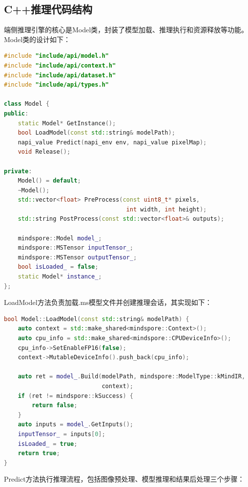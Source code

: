\subsection{C++推理代码结构}

端侧推理引擎的核心是Model类，封装了模型加载、推理执行和资源释放等功能。Model类的设计如下：

\begin{lstlisting}[language=C++, caption={Model类头文件}]
#include "include/api/model.h"
#include "include/api/context.h"
#include "include/api/dataset.h"
#include "include/api/types.h"

class Model {
public:
    static Model* GetInstance();
    bool LoadModel(const std::string& modelPath);
    napi_value Predict(napi_env env, napi_value pixelMap);
    void Release();

private:
    Model() = default;
    ~Model();
    std::vector<float> PreProcess(const uint8_t* pixels,
                                   int width, int height);
    std::string PostProcess(const std::vector<float>& outputs);

    mindspore::Model model_;
    mindspore::MSTensor inputTensor_;
    mindspore::MSTensor outputTensor_;
    bool isLoaded_ = false;
    static Model* instance_;
};
\end{lstlisting}

LoadModel方法负责加载.ms模型文件并创建推理会话，其实现如下：

\begin{lstlisting}[language=C++, caption={LoadModel方法实现}]
bool Model::LoadModel(const std::string& modelPath) {
    auto context = std::make_shared<mindspore::Context>();
    auto cpu_info = std::make_shared<mindspore::CPUDeviceInfo>();
    cpu_info->SetEnableFP16(false);
    context->MutableDeviceInfo().push_back(cpu_info);

    auto ret = model_.Build(modelPath, mindspore::ModelType::kMindIR,
                            context);
    if (ret != mindspore::kSuccess) {
        return false;
    }
    auto inputs = model_.GetInputs();
    inputTensor_ = inputs[0];
    isLoaded_ = true;
    return true;
}
\end{lstlisting}

Predict方法执行推理流程，包括图像预处理、模型推理和结果后处理三个步骤：

